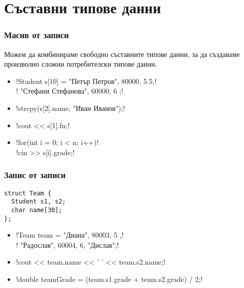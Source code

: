 \documentclass[alsotrans]{beamerswitch}
\begin{document}
\section{Съставни типове данни}

\begin{frame}[fragile]
  \frametitle{Масив от записи}

  Можем да комбинираме свободно съставните типове данни, за да създаваме произволно сложни потребителски типове данни.\\
  \pause
  \begin{itemize}[<+->]
  \item \lst!Student s[10] = { { "Петър Петров", 80000, 5.5},!\\
      \hspace{21ex}\lst!{ "Стефани Стефанова", 60000, 6 } };!
  \item \lst!strcpy(s[2].name, "Иван Иванов");!
  \item \lst!cout << s[1].fn;!
  \item \lst!for(int i = 0; i < n; i++)!\\
    \hspace{2ex}\lst!cin >> s[i].grade;!
  \end{itemize}
\end{frame}

\begin{frame}[fragile]
  \frametitle{Запис от записи}

\begin{lstlisting}
struct Team {
  Student s1, s2;
  char name[30];
};
\end{lstlisting}
\pause
  \begin{itemize}[<+->]
  \item \lst!Team team = { { "Диана", 80003, 5 },!\\
      \hspace{16ex}\lst!{ "Радослав", 60004, 6}, "Дислав"};!
  \item \lst!cout << team.name << ' ' << team.s2.name;!
  \item \lst!double teamGrade = (team.s1.grade + team.s2.grade) / 2;!
  \end{itemize}
\end{frame}
\end{document}
